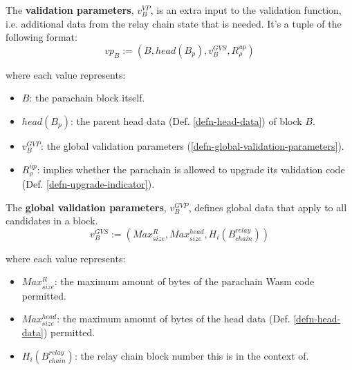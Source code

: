 \begin{definition}  \label{defn-extra-validation-data}
  The \textbf{validation parameters}, $v^{VP}_B$, is an extra input to the validation
  function, i.e. additional data from the relay chain state that is needed.
  It's a tuple of the following format:
  \[
  vp_B := (B, head(B_p), v^{GVS}_B, R^{up}_{\rho})
  \]

  where each value represents:

  \begin{itemize}
    \item $B$: the parachain block itself.
    \item $head(B_p)$: the parent head data (Def. \ref{defn-head-data}) of block
    $B$.
    \item $v^{GVP}_B$: the global validation parameters
    (\ref{defn-global-validation-parameters}).
    \item $R^{up}_{\rho}$: implies whether the parachain is allowed to upgrade
    its validation code (Def. \ref{defn-upgrade-indicator}).
  \end{itemize}
\end{definition}

\begin{definition}
  \label{defn-global-validation-parameters}
  The \textbf{global validation parameters}, $v^{GVP}_B$, defines global data 
  that apply to all candidates in a block.
  \[
    v^{GVS}_B := (Max^{R}_{size}, Max^{head}_{size}, H_i(B^{relay}_{chain}))
  \]

  where each value represents:

  \begin{itemize}
    \item $Max^{R}_{size}$: the maximum amount of bytes of the parachain Wasm
    code permitted.
    \item $Max^{head}_{size}$: the maximum amount of bytes of the head data
    (Def. \ref{defn-head-data}) permitted.
    \item $H_i(B^{relay}_{chain})$: the relay chain block number this is in the
    context of.
  \end{itemize}
\end{definition}

